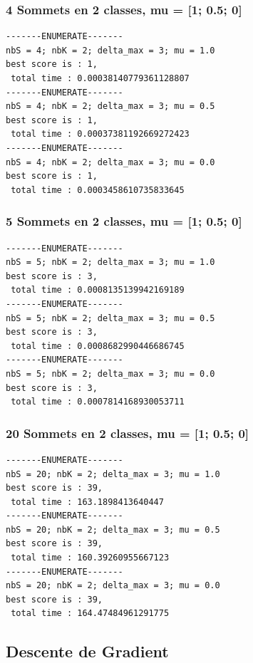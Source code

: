 \documentclass[a4paper]{article}
\begin{document}
\subsubsection{4 Sommets en 2 classes, mu = [1; 0.5; 0]}
\begin{verbatim}
-------ENUMERATE-------
nbS = 4; nbK = 2; delta_max = 3; mu = 1.0
best score is : 1,
 total time : 0.00038140779361128807
-------ENUMERATE-------
nbS = 4; nbK = 2; delta_max = 3; mu = 0.5
best score is : 1,
 total time : 0.00037381192669272423
-------ENUMERATE-------
nbS = 4; nbK = 2; delta_max = 3; mu = 0.0
best score is : 1,
 total time : 0.0003458610735833645
\end{verbatim}
\subsubsection{5 Sommets en 2 classes, mu = [1; 0.5; 0]}
\begin{verbatim}
-------ENUMERATE-------
nbS = 5; nbK = 2; delta_max = 3; mu = 1.0
best score is : 3,
 total time : 0.0008135139942169189
-------ENUMERATE-------
nbS = 5; nbK = 2; delta_max = 3; mu = 0.5
best score is : 3,
 total time : 0.0008682990446686745
-------ENUMERATE-------
nbS = 5; nbK = 2; delta_max = 3; mu = 0.0
best score is : 3,
 total time : 0.0007814168930053711
\end{verbatim}
\subsubsection{20 Sommets en 2 classes, mu = [1; 0.5; 0]}
\begin{verbatim}
-------ENUMERATE-------
nbS = 20; nbK = 2; delta_max = 3; mu = 1.0
best score is : 39,
 total time : 163.1898413640447
-------ENUMERATE-------
nbS = 20; nbK = 2; delta_max = 3; mu = 0.5
best score is : 39,
 total time : 160.39260955667123
-------ENUMERATE-------
nbS = 20; nbK = 2; delta_max = 3; mu = 0.0
best score is : 39,
 total time : 164.47484961291775
\end{verbatim}

\subsection{Descente de Gradient}
\end{document}
